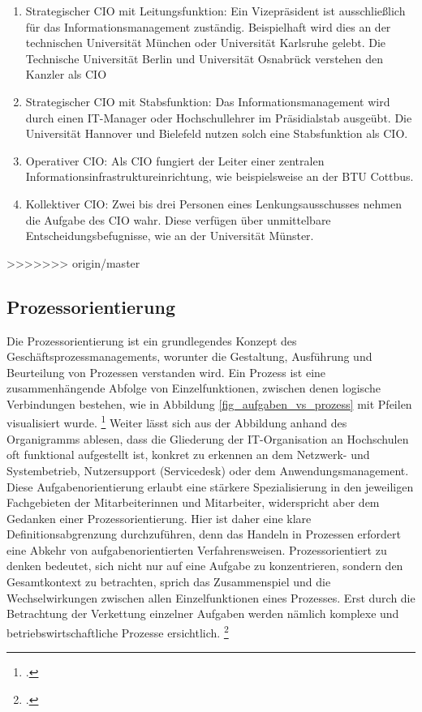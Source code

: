 \begin{enumerate}
	\item Strategischer CIO mit Leitungsfunktion: Ein Vizepräsident ist ausschließlich für das Informationsmanagement zuständig. Beispielhaft wird dies an der technischen Universität München oder Universität Karlsruhe gelebt. Die Technische Universität Berlin und Universität Osnabrück verstehen den Kanzler als CIO
	\item Strategischer CIO mit Stabsfunktion: Das Informationsmanagement wird durch einen IT-Manager oder Hochschullehrer im Präsidialstab ausgeübt. Die Universität Hannover und Bielefeld nutzen solch eine Stabsfunktion als CIO.
	\item Operativer CIO: Als CIO fungiert der Leiter einer zentralen Informationsinfrastruktureinrichtung, wie beispielsweise an der BTU Cottbus.
	\item Kollektiver CIO: Zwei bis drei Personen eines Lenkungsausschusses nehmen die Aufgabe des CIO wahr. Diese verfügen über unmittelbare Entscheidungsbefugnisse, wie an der Universität Münster.
\end{enumerate}
>>>>>>> origin/master


\subsection{Prozessorientierung}
\label{subsection_prozessorientierung}
Die Prozessorientierung ist ein grundlegendes Konzept des Geschäftsprozessmanagements, worunter die Gestaltung, Ausführung und Beurteilung von Prozessen verstanden wird. Ein Prozess ist eine zusammenhängende Abfolge von Einzelfunktionen, zwischen denen logische Verbindungen bestehen, wie in Abbildung \ref{fig_aufgaben_vs_prozess} mit Pfeilen visualisiert wurde. \footcite[Vgl.][60]{krcmar_einfuhrung_2015} Weiter lässt sich aus der Abbildung anhand des Organigramms ablesen, dass die Gliederung der IT-Organisation an Hochschulen oft funktional aufgestellt ist, konkret zu erkennen an dem Netzwerk- und Systembetrieb, Nutzersupport (Servicedesk) oder dem Anwendungsmanagement. Diese Aufgabenorientierung erlaubt eine stärkere Spezialisierung in den jeweiligen Fachgebieten der Mitarbeiterinnen und Mitarbeiter, widerspricht aber dem Gedanken einer Prozessorientierung. Hier ist daher eine klare Definitionsabgrenzung durchzuführen, denn das Handeln in Prozessen erfordert eine Abkehr von aufgabenorientierten Verfahrensweisen. Prozessorientiert zu denken bedeutet, sich nicht nur auf eine Aufgabe zu konzentrieren, sondern den Gesamtkontext zu betrachten, sprich das Zusammenspiel und die Wechselwirkungen zwischen allen Einzelfunktionen eines Prozesses. Erst durch die Betrachtung der Verkettung einzelner Aufgaben werden nämlich komplexe und betriebswirtschaftliche Prozesse ersichtlich. \footcite[Vgl.][274]{heinrich_stelzer_2011}


